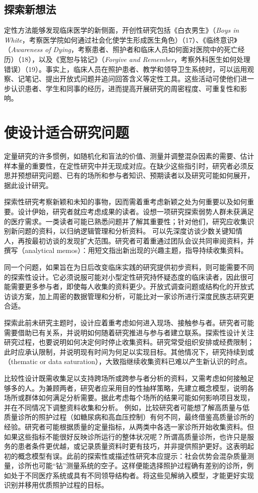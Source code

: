 \subsection{探索新想法}
定性方法能够发现临床医学的新侧面，开创性研究包括《白衣男生》（\textit{Boys in White}，考察医学院如何通过社会化使学生形成医生角色）（17）、《临终意识》（\textit{Awareness of Dying}，考察患者、照护者和临床人员如何面对医院中的死亡经历）（18），以及《宽恕与铭记》（\textit{Forgive and Remember}，考察外科医生如何处理错误）（19）。事实上，临床人员在照护患者、教学和领导卫生系统时，可以运用观察、记笔记、提出开放式问题并追问回答含义等定性工具。这些活动可使他们进一步认识患者、学生和同事的经历，进而提高开展研究的周密程度、可重复性和影响。

\section{使设计适合研究问题}
定量研究的许多惯例，如随机化和盲法的价值、测量并调整混杂因素的需要、估计样本量的重要性，在定性研究中并无现成对应。在缺少这些指引时，研究者必须反思并预想研究问题、已有的场所和参与者知识、预期读者以及研究可能如何展开，据此设计研究。

探索性研究考察新颖和未知的事物，因而需着重考虑新颖之处为何重要以及如何重要。设计伊始，研究者就应考虑成果的读者。设想一项研究探索弱势人群未获满足的医疗需求。一类读者可能已熟悉问题并了解其重要性；针对他们，研究应收集识别新问题的资料，以归纳逻辑管理和分析资料。
可以先深度访谈少数关键知情人，再按最初访谈的发现扩大范围。研究者可着重通过团队会议共同审阅资料，并撰写（analytical memos）：用短文指出新出现的兴趣主题，指导持续收集资料。

同一个问题，如果旨在为日后改变临床实践的研究提供初步资料，则可能需要不同的探索性设计。它必须说服可能对小型定性研究持怀疑态度的临床读者，因此很可能需要更多参与者，即使每人收集的资料更少。开放式调查问题或结构化的开放式访谈方案，加上周密的数据管理和分析，可能比对一家诊所进行深度民族志研究更合适。

探索此前未研究主题时，设计应着重考虑如何进入现场、接触参与者。研究者可能需要借助已有关系，并说明如何随着研究推进与参与者建立联系。探索性设计关注研究过程，也要说明如何决定何时停止收集资料。研究常受组织安排或经费限制；此时应承认限制，并说明现有时间为何足以实现目标。其他情况下，研究持续到或（thematic or data saturation），大致指继续收集资料已难以产生新认识的时点。

比较性设计既需收集足以支持跨场所或跨参与者分析的资料，又需考虑如何接触足够多的人。为兼顾两者，研究者应采用目的性抽样策略，先建立概念模型，说明各场所或群体如何满足分析需要。据此考虑每个场所的结果可能如何影响项目发现，并在不同情况下调整资料收集和分析。
例如，比较研究者可能想了解高质量与低质量诊所的照护过程（如糖尿病和高血压控制）有何不同，最终借鉴高质量诊所的经验。研究者可能根据质量的定量指标，从两类中各选一家诊所开始收集资料。但如果这些指标不能很好反映诊所运行的整体状况呢？所谓高质量诊所，也许只是服务的患者条件更优越，或记录质量资料时更有技巧，并非提供照护更好。这表明起初的概念模型有误。此前的探索性或描述性研究本应提示：社会优势会混杂质量测量，诊所也可能“钻”测量系统的空子。这样便能选择照护过程确有差别的诊所，例如处于不同医疗系统或具有不同领导结构者。将这些见解纳入模型，才能更好实现识别并移用优质照护过程的目标。

